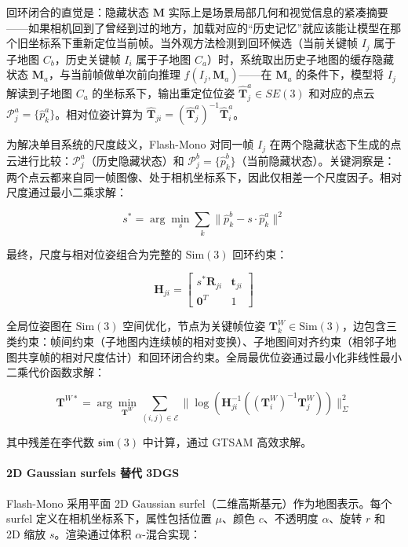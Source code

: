 回环闭合的直觉是：隐藏状态 $\mathbf{M}$ 实际上是场景局部几何和视觉信息的紧凑摘要——如果相机回到了曾经到过的地方，加载对应的``历史记忆''就应该能让模型在那个旧坐标系下重新定位当前帧。当外观方法检测到回环候选（当前关键帧 $I_j$ 属于子地图 $C_b$，历史关键帧 $I_i$ 属于子地图 $C_a$）时，系统取出历史子地图的缓存隐藏状态 $\mathbf{M}_a$，与当前帧做单次前向推理 $f(I_j, \mathbf{M}_a)$——在 $\mathbf{M}_a$ 的条件下，模型将 $I_j$ 解读到子地图 $C_a$ 的坐标系下，输出重定位位姿 $\hat{\mathbf{T}}_j^a \in SE(3)$ 和对应的点云 $\mathcal{P}_j^a = \{\hat{p}_k^a\}$。相对位姿计算为 $\hat{\mathbf{T}}_{ji} = (\hat{\mathbf{T}}_j^a)^{-1}\hat{\mathbf{T}}_i^a$。

为解决单目系统的尺度歧义，Flash-Mono 对同一帧 $I_j$ 在两个隐藏状态下生成的点云进行比较：$\mathcal{P}_j^a$（历史隐藏状态）和 $\mathcal{P}_j^b = \{\hat{p}_k^b\}$（当前隐藏状态）。关键洞察是：两个点云都来自同一帧图像、处于相机坐标系下，因此仅相差一个尺度因子。相对尺度通过最小二乘求解：

\begin{equation}
s^* = \arg\min_s \sum_k \| \hat{p}_k^b - s \cdot \hat{p}_k^a \|^2
\end{equation}

最终，尺度与相对位姿组合为完整的 $\mathrm{Sim}(3)$ 回环约束：

\begin{equation}
\mathbf{H}_{ji} = \begin{bmatrix} s^*\mathbf{R}_{ji} & \mathbf{t}_{ji} \\ \mathbf{0}^T & 1 \end{bmatrix}
\end{equation}

全局位姿图在 $\mathrm{Sim}(3)$ 空间优化，节点为关键帧位姿 $\mathbf{T}_k^W \in \mathrm{Sim}(3)$，边包含三类约束：帧间约束（子地图内连续帧的相对变换）、子地图间对齐约束（相邻子地图共享帧的相对尺度估计）和回环闭合约束。全局最优位姿通过最小化非线性最小二乘代价函数求解：

\begin{equation}
\mathbf{T}^{W*} = \arg\min_{\mathbf{T}^W} \sum_{(i,j) \in \mathcal{E}} \| \log(\mathbf{H}_{ji}^{-1}((\mathbf{T}_i^W)^{-1}\mathbf{T}_j^W)) \|^2_{\Sigma}
\end{equation}

其中残差在李代数 $\mathfrak{sim}(3)$ 中计算，通过 GTSAM 高效求解。

\paragraph{2D Gaussian surfels 替代 3DGS}
Flash-Mono 采用平面 2D Gaussian surfel（二维高斯基元）作为地图表示。每个 surfel 定义在相机坐标系下，属性包括位置 $\mu$、颜色 $c$、不透明度 $\alpha$、旋转 $r$ 和 2D 缩放 $s$。渲染通过体积 $\alpha$-混合实现：

